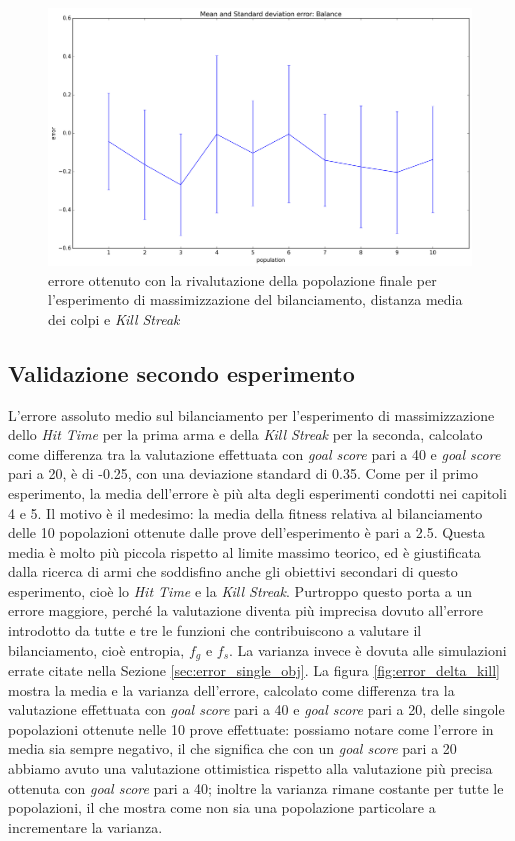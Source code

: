 \documentclass[12pt, italian]{toptesi}
\begin{document}
\begin{figure}[tp]
\centering
\includegraphics[width=1.0\textwidth]{error_dist_kill}
\caption{errore ottenuto con la rivalutazione della popolazione finale per l'esperimento di massimizzazione del bilanciamento, distanza media dei colpi e \emph{Kill Streak}}
\label{fig:error_dist_kill}
\end{figure}

\subsection{Validazione secondo esperimento}
\label{sec:val_secondo}

L'errore assoluto medio sul bilanciamento per l'esperimento di massimizzazione dello \emph{Hit Time} per la prima arma e della \emph{Kill Streak} per la seconda, calcolato come differenza tra la valutazione effettuata con \emph{goal score} pari a 40 e \emph{goal score} pari a 20, è di -0.25, con una deviazione standard di 0.35.
Come per il primo esperimento, la media dell'errore è più alta degli esperimenti condotti nei capitoli 4 e 5. Il motivo è il medesimo: la media della fitness relativa al bilanciamento delle 10 popolazioni ottenute dalle prove dell'esperimento è pari a 2.5.
Questa media è molto più piccola rispetto al limite massimo teorico, ed è giustificata dalla ricerca di armi che soddisfino anche gli obiettivi secondari di questo esperimento, cioè lo \emph{Hit Time} e la \emph{Kill Streak}.
Purtroppo questo porta a un errore maggiore, perché la valutazione diventa più imprecisa dovuto all'errore introdotto da tutte e tre le funzioni che contribuiscono a valutare il bilanciamento, cioè entropia, $f_g$ e $f_s$.
La varianza invece è dovuta alle simulazioni errate citate nella Sezione \ref{sec:error_single_obj}.
La figura \ref{fig:error_delta_kill} mostra la media e la varianza dell'errore, calcolato come differenza tra la valutazione effettuata con \emph{goal score} pari a 40 e \emph{goal score} pari a 20, delle singole popolazioni ottenute nelle 10 prove effettuate: possiamo notare come l'errore in media sia sempre negativo, il che significa che con un \emph{goal score} pari a 20 abbiamo avuto una valutazione ottimistica rispetto alla valutazione più precisa ottenuta con \emph{goal score} pari a 40; inoltre la varianza rimane costante per tutte le popolazioni, il che mostra come non sia una popolazione particolare a incrementare la varianza.
\end{document}
